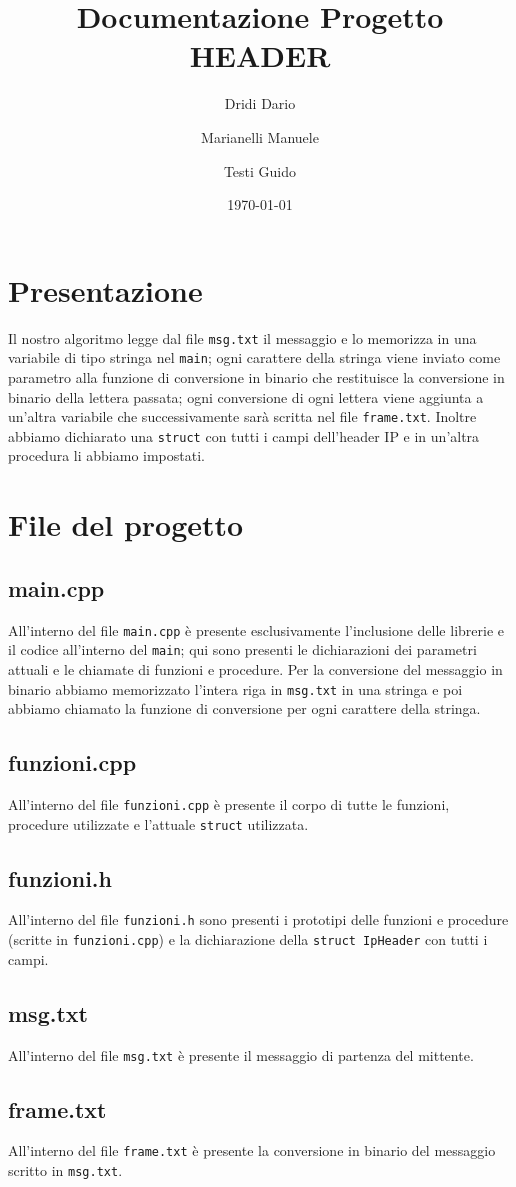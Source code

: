 \documentclass{article}
\title{Documentazione Progetto HEADER}
\author{Dridi Dario \and Marianelli Manuele \and Testi Guido}
\date{\today}
\begin{document}
\maketitle

\section{Presentazione}
Il nostro algoritmo legge dal file \texttt{msg.txt} il messaggio e lo memorizza in una variabile di tipo stringa nel \texttt{main}; ogni carattere della stringa viene inviato come parametro alla funzione di conversione in binario che restituisce la conversione in binario della lettera passata; ogni conversione di ogni lettera viene aggiunta a un’altra variabile che successivamente sarà scritta nel file \texttt{frame.txt}. Inoltre abbiamo dichiarato una \texttt{struct} con tutti i campi dell’header IP e in un’altra procedura li abbiamo impostati.

\section{File del progetto}
\subsection{main.cpp}
All’interno del file \texttt{main.cpp} è presente esclusivamente l’inclusione delle librerie e il codice all’interno del \texttt{main}; qui sono presenti le dichiarazioni dei parametri attuali e le chiamate di funzioni e procedure. Per la conversione del messaggio in binario abbiamo memorizzato l’intera riga in \texttt{msg.txt} in una stringa e poi abbiamo chiamato la funzione di conversione per ogni carattere della stringa.

\subsection{funzioni.cpp}
All’interno del file \texttt{funzioni.cpp} è presente il corpo di tutte le funzioni, procedure utilizzate e l’attuale \texttt{struct} utilizzata.

\subsection{funzioni.h}
All’interno del file \texttt{funzioni.h} sono presenti i prototipi delle funzioni e procedure (scritte in \texttt{funzioni.cpp}) e la dichiarazione della \texttt{struct IpHeader} con tutti i campi.

\subsection{msg.txt}
All’interno del file \texttt{msg.txt} è presente il messaggio di partenza del mittente.

\subsection{frame.txt}
All’interno del file \texttt{frame.txt} è presente la conversione in binario del messaggio scritto in \texttt{msg.txt}.
\end{document}
